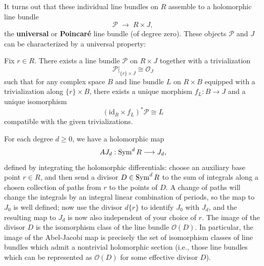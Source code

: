 \documentclass[12pt]{article}
\begin{document}
It turns out that these individual line bundles on $R$
assemble to a holomorphic line bundle
\[
    \mathcal P \;\to\; R \times J,
\]
the \textbf{universal} or \textbf{Poincaré} line bundle (of degree zero). These objects $\mathcal P$ and $J$ can be characterized by a universal property:

\begin{proposition}
    Fix $r\in R$. There exists a line bundle $\mathcal P$ on $R\times J$
    together with a trivialization
    \[
        \mathcal P|_{\{r\}\times J} \cong \mathcal O_J
    \]
    such that for any complex space $B$ and line bundle $L$ on $R\times B$
    equipped with a trivialization along $\{r\}\times B$, there exists a unique
    morphism $f_L:B\to J$ and a unique isomorphism
    \[
        (\mathrm{id}_R\times f_L)^*\mathcal P \cong L
    \]
    compatible with the given trivializations.
\end{proposition}



For each degree $d \ge 0$, we have a holomorphic map
\[
    AJ_d : \operatorname{Sym}^d R \longrightarrow J_d,
\]
defined by integrating the holomorphic differentials:
choose an auxiliary base point $r \in R$, and then send a divisor
$D \in \operatorname{Sym}^d R$ to the sum of integrals along a chosen collection of paths
from $r$ to the points of $D$.
A change of paths will change the integrals by an integral linear combination of periods,
so the map to $J_0$ is well defined;
now use the divisor $d\{r\}$ to identify $J_0$ with $J_d$,
and the resulting map to $J_d$ is now also independent of your choice of $r$. The image of the divisor $D$
is the isomorphism class of the line bundle $\mathcal{O}(D)$. In particular, the image of the Abel-Jacobi map is precisely the set of isomorphism classes of line bundles which admit a nontrivial holomorphic section
(i.e., those line bundles which can be represented as $\mathcal{O}(D)$ for some effective divisor $D$).
\end{document}
